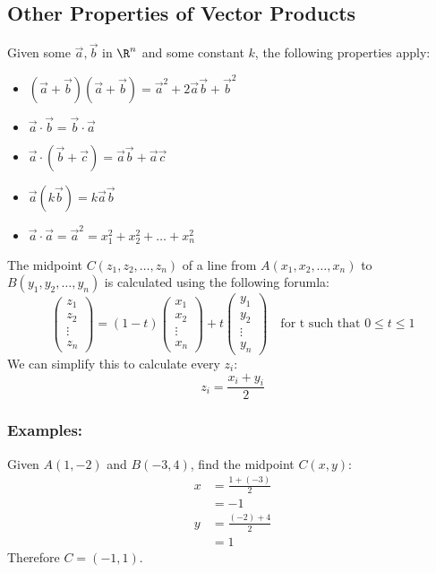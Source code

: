 \documentclass[a4paper]{article}
\begin{document}
  \subsection{Other Properties of Vector Products}
  Given some $\vec{a},\vec{b}$ in $\R^n$ and some constant $k$, the following properties apply:
  \begin{itemize}
    \item $(\vec{a}+\vec{b})(\vec{a}+\vec{b}) = \vec{a}^2+2\vec{a}\vec{b}+\vec{b}^2$
    \item $\vec{a} \cdot \vec{b} = \vec{b} \cdot \vec{a}$
    \item $\vec{a} \cdot (\vec{b}+\vec{c}) = \vec{a}\vec{b} + \vec{a}\vec{c}$
    \item $\vec{a}(k\vec{b}) = k\vec{a}\vec{b}$
    \item $\vec{a} \cdot \vec{a} = \vec{a}^2 = x_1^2 + x_2^2 + \dots + x_n^2$
  \end{itemize}
  The midpoint $C(z_1,z_2,\dots,z_n)$ of a line from $A(x_1,x_2,\dots,x_n)$ to $B(y_1,y_2,\dots,y_n)$ is calculated using the following forumla:
  \[
    \begin{pmatrix}
    z_1 \\ z_2 \\ \vdots \\ z_n
    \end{pmatrix}
    = (1-t)
    \begin{pmatrix}
     x_1 \\ x_2 \\ \vdots \\ x_n 
    \end{pmatrix}
    + t
    \begin{pmatrix}
     y_1 \\ y_2 \\ \vdots \\ y_n 
    \end{pmatrix}
    \quad
    \textrm{for t such that }
    0 \le t \le 1
  \]
  We can simplify this to calculate every $z_i$:
  \[
    z_i = \displaystyle\frac{x_i+y_i}{2}
  \]
  \subsubsection{Examples:}
  Given $A(1,-2)$ and $B(-3,4)$, find the midpoint $C(x,y)$:
  \begin{equation}
    \begin{split}
      x &= \displaystyle\frac{1+(-3 )}{2} \\
        &= -1\\
      y &= \displaystyle\frac{(-2)+4 }{2} \\
        &= 1
    \end{split}
  \end{equation}
  Therefore $C = (-1,1)$.
\end{document}
